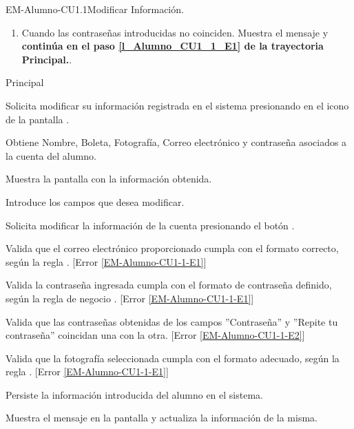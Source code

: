 \begin{UseCase}{EM-Alumno-CU1.1}{Modificar Información.}
{\begin{enumerate}
			\item \label{EM-Alumno-CU1-1-E2} Cuando las contraseñas introducidas no coinciden. Muestra el mensaje  y \textbf{continúa en el paso \ref{l_Alumno_CU1_1_E1} de la trayectoria Principal.}.
		\end{enumerate}
	}
\end{UseCase}

\begin{UCtrayectoria}{Principal}

	\UCpaso [\UCactor] Solicita modificar su información registrada en el sistema
	presionando en el icono  de la pantalla . 

	\UCpaso Obtiene Nombre, Boleta, Fotografía, Correo electrónico y contraseña
	asociados a la cuenta del alumno.

	\UCpaso Muestra la pantalla  con la información obtenida.

	\UCpaso[\UCactor] Introduce los campos que desea modificar. \label{l_Alumno_CU1_1_E1}

	\UCpaso [\UCactor] Solicita modificar la información de la cuenta
	presionando el botón .
	
	\UCpaso Valida que el correo electrónico proporcionado cumpla con el formato correcto, según la regla . [Error  \ref{EM-Alumno-CU1-1-E1}]

    \UCpaso Valida la contraseña ingresada cumpla con el formato de contraseña definido, según la regla de negocio . [Error  \ref{EM-Alumno-CU1-1-E1}]

    \UCpaso Valida que las contraseñas obtenidas de los campos ''Contraseña'' y ''Repite tu contraseña'' coincidan una con la otra. [Error  \ref{EM-Alumno-CU1-1-E2}]

    \UCpaso Valida que la fotografía seleccionada cumpla con el formato adecuado, según la regla . [Error \ref{EM-Alumno-CU1-1-E1}]  

    \UCpaso Persiste la información introducida del alumno en el sistema. \label{l_EM_Alumno_CU1_1_PersisteInfo}

    \UCpaso Muestra el mensaje  en la pantalla
     y actualiza la
    información de la misma. 
     
\end{UCtrayectoria}

